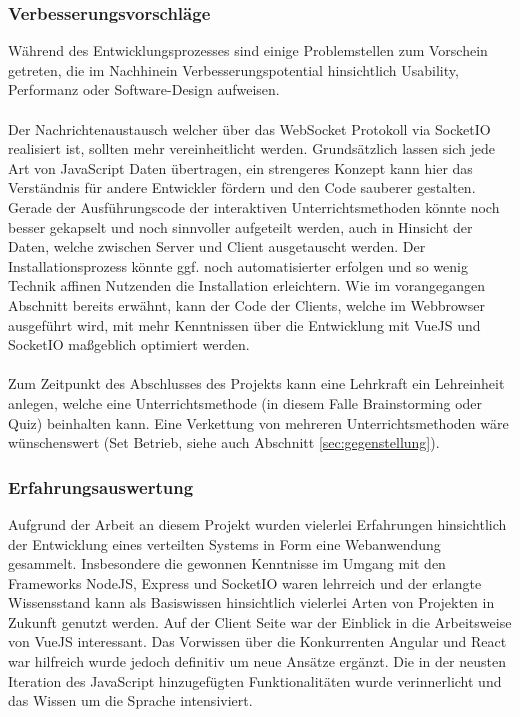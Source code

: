 \subsubsection{Verbesserungsvorschläge}\label{sec:verbesserung}
Während des Entwicklungsprozesses sind einige Problemstellen zum Vorschein getreten, die im Nachhinein Verbesserungspotential hinsichtlich Usability, Performanz oder Software-Design aufweisen. \\ \\
Der Nachrichtenaustausch welcher über das WebSocket Protokoll via SocketIO realisiert ist, sollten mehr vereinheitlicht werden. Grundsätzlich lassen sich jede Art von JavaScript Daten übertragen, ein strengeres Konzept kann hier das Verständnis für andere Entwickler fördern und den Code sauberer gestalten. Gerade der Ausführungscode der interaktiven Unterrichtsmethoden könnte noch besser gekapselt und noch sinnvoller aufgeteilt werden, auch in Hinsicht der Daten, welche zwischen Server und Client ausgetauscht werden. Der Installationsprozess könnte ggf. noch automatisierter erfolgen und so wenig Technik affinen Nutzenden die Installation erleichtern.  
Wie im vorangegangen Abschnitt bereits erwähnt, kann der Code der Clients, welche im Webbrowser ausgeführt wird, mit mehr Kenntnissen über die Entwicklung mit VueJS und SocketIO maßgeblich optimiert werden. \\ \\ Zum Zeitpunkt des Abschlusses des Projekts kann eine Lehrkraft ein Lehreinheit anlegen, welche eine Unterrichtsmethode (in diesem Falle Brainstorming oder Quiz) beinhalten kann. Eine Verkettung von mehreren Unterrichtsmethoden wäre wünschenswert (Set Betrieb, siehe auch Abschnitt \ref{sec:gegenstellung}). 


\subsubsection{Erfahrungsauswertung}\label{sec:erfahrungen}
Aufgrund der Arbeit an diesem Projekt wurden vielerlei Erfahrungen hinsichtlich der Entwicklung eines verteilten Systems in Form eine Webanwendung gesammelt. Insbesondere die gewonnen Kenntnisse im Umgang mit den Frameworks NodeJS, Express und SocketIO waren lehrreich und der erlangte Wissensstand kann als Basiswissen hinsichtlich vielerlei Arten von Projekten in Zukunft genutzt werden. Auf der Client Seite war der Einblick in die Arbeitsweise von VueJS interessant. Das Vorwissen über die Konkurrenten Angular und React war hilfreich wurde jedoch definitiv um neue Ansätze ergänzt. Die in der neusten Iteration des JavaScript hinzugefügten Funktionalitäten wurde verinnerlicht und das Wissen um die Sprache intensiviert.     

